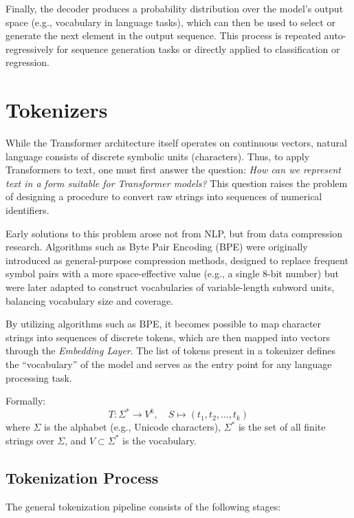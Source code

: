 Finally, the decoder produces a probability distribution over the model's output space (e.g., vocabulary in language tasks), which can then be used to select or generate the next element in the output sequence. This process is repeated auto-regressively for sequence generation tasks or directly applied to classification or regression.


\section{Tokenizers}\label{Section2.1}

While the Transformer architecture itself operates on continuous vectors, natural language consists of discrete symbolic units (characters). 
Thus, to apply Transformers to text, one must first answer the question: \emph{How can we represent text in a form suitable for Transformer models?} This question raises the problem of designing a procedure to convert raw strings into sequences of numerical identifiers.

Early solutions to this problem arose not from NLP, but from data compression research. Algorithms such as Byte Pair Encoding (BPE) \cite{gage1994new} were originally introduced as general-purpose compression methods, designed to replace frequent symbol pairs with a more space-effective value (e.g., a single 8-bit number) but were later adapted to construct vocabularies of variable-length subword units, balancing vocabulary size and coverage.

By utilizing algorithms such as BPE, it becomes possible to map character strings into sequences of discrete tokens, which are then mapped into vectors through the \emph{Embedding Layer}. The list of tokens present in a tokenizer defines the ``vocabulary'' of the model and serves as the entry point for any language processing task.


Formally:
$$
T : \Sigma^* \rightarrow V^k, \quad S \mapsto (t_1, t_2, \dots, t_k)
$$
where $\Sigma$ is the alphabet (e.g., Unicode characters), $\Sigma^*$ is the set of all finite strings over $\Sigma$, and $V \subset \Sigma^*$ is the vocabulary.

\subsection{Tokenization Process}
The general tokenization pipeline consists of the following stages:


